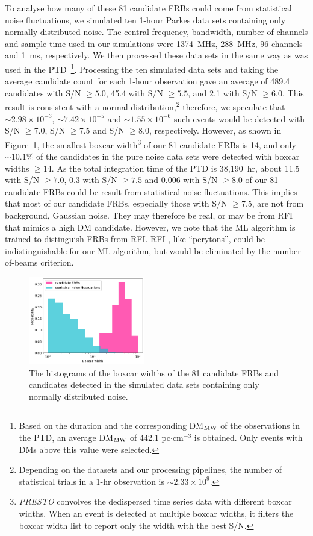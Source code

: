 \documentclass[fleqn,usenatbib]{mnras}
\begin{document}
To analyse how many of these 81 candidate FRBs could come from statistical noise fluctuations, we simulated ten 1-hour Parkes data sets containing only normally distributed noise. The central frequency, bandwidth, number of channels and sample time used in our simulations were 1374~MHz, 288~MHz, 96 channels and 1~ms, respectively. We then processed these data sets in the same way as was used in the PTD~\footnote{Based on the duration and the corresponding DM$_{\rm MW}$ of the observations in the PTD, an average DM$_{\rm MW}$ of 442.1 pc$\cdot$cm$^{-3}$ is obtained. Only events with DMs above this value were selected.}. Processing the ten simulated data sets and taking the average candidate count for each 1-hour observation gave an average of 489.4 candidates with S/N $\ge 5.0$, 45.4 with S/N $\ge 5.5$, and 2.1 with S/N $\ge 6.0$. This result is consistent with a normal distribution,\footnote{Depending on the datasets and our processing pipelines, the number of statistical trials in a 1-hr observation is $\sim 2.33 \times 10^{9}$. } therefore, we speculate that $\sim 2.98\times 10^{-3}$, $\sim 7.42 \times 10^{-5}$ and $\sim 1.55 \times 10^{-6}$ such events would be detected with S/N $\ge 7.0$, S/N $\ge 7.5$ and S/N $\ge 8.0$, respectively. However, as shown in Figure~\ref{fig:6}, the smallest boxcar width\footnote{\emph{\sc PRESTO} convolves the dedispersed time series data with different boxcar widths. When an event is detected at multiple boxcar widths, it filters the boxcar width list to report only the width with the best S/N.} of our 81 candidate FRBs is 14, and only $\sim 10.1\%$ of the candidates in the pure noise data sets were detected with boxcar widths $\ge 14$. As the total integration time of the PTD is 38,190~hr, about 11.5 with S/N $\ge 7.0$, 0.3 with S/N $\ge 7.5$ and 0.006 with S/N $\ge 8.0$ of our 81 candidate FRBs could be result from statistical noise fluctuations. This implies that most of our candidate FRBs, especially those with S/N $\ge 7.5$, are not from background, Gaussian noise. They may therefore be real, or may be from RFI that mimics a high DM candidate. 
However, we note that the ML algorithm is trained to distinguish FRBs from RFI. RFI , like ``perytons'', could be indistinguishable for our ML algorithm, but would be eliminated by the number-of-beams criterion.


\begin{figure}
\begin{center}
\includegraphics[width=0.45\textwidth]{pic/boxcar.png}
    \caption{The histograms of the boxcar widths of the 81 candidate FRBs and candidates detected in the simulated data sets containing only normally distributed noise.}
    \label{fig:6}
\end{center}
\end{figure}
\end{document}

